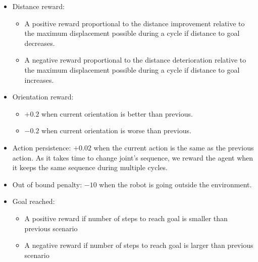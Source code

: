         \begin{itemize}
            \item Distance reward:
            \begin{itemize}
                \item A positive reward proportional to the distance improvement relative to the maximum displacement possible during a cycle if distance to goal decreases.
                \item A negative reward proportional to the distance deterioration relative to the maximum displacement possible during a cycle if distance to goal increases.
            \end{itemize}
            \item Orientation reward:
            \begin{itemize}
                \item $+0.2$ when current orientation is better than previous.
                \item $-0.2$ when current orientation is worse than previous.
            \end{itemize}
            \item Action persistence: $+0.02$ when the current action is the same as the previous action. As it takes time to change joint's sequence, we reward the agent when it keeps the same sequence during multiple cycles.
            \item Out of bound penalty: $-10$ when the robot is going outside the environment.
            \item Goal reached:
                \begin{itemize}
                    \item A positive reward if number of steps to reach goal is smaller than previous scenario
                    \item A negative reward if number of steps to reach goal is larger than previous scenario
                \end{itemize}
        \end{itemize}
        
            
            